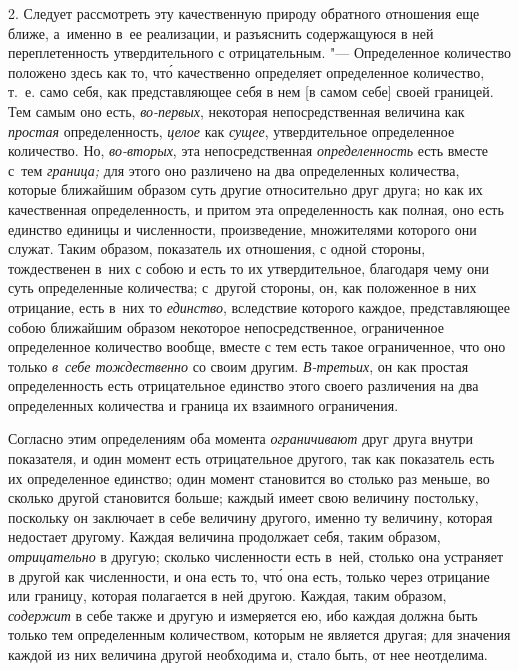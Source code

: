 2. Следует рассмотреть эту качественную природу обратного отношения еще ближе,
а~именно в~ее реализации, и разъяснить содержащуюся в ней переплетенность
утвердительного с отрицательным. "--- Определенное количество положено здесь
как то, чт\'{о} качественно определяет определенное количество, т.~е. само
себя, как представляющее себя в нем [в самом себе] своей границей. Тем самым
оно есть, {\em во-первых}, некоторая непосредственная величина как
{\em простая} определенность, {\em целое} как {\em сущее}, утвердительное
определенное количество. Но, {\em во-вторых}, эта непосредственная
{\em определенность} есть вместе с~тем {\em граница;} для этого оно различено
на два определенных количества, которые ближайшим образом суть другие
относительно друг друга; но как их качественная определенность, и притом эта
определенность как полная, оно есть единство единицы и численности,
произведение, множителями которого они служат. Таким образом, показатель их
отношения, с одной стороны, тождественен в~них с собою и есть то их
утвердительное, благодаря чему они суть определенные количества; с~другой
стороны, он, как положенное в них отрицание, есть в~них то {\em единство},
вследствие которого каждое, представляющее собою ближайшим образом некоторое
непосредственное, ограниченное определенное количество вообще, вместе с тем
есть такое ограниченное, что оно только {\em в~себе тождественно} со своим
другим. {\em В-третьих}, он как простая определенность есть отрицательное
единство этого своего различения на два определенных количества и граница их
взаимного ограничения.

Согласно этим определениям оба момента {\em ограничивают} друг друга внутри
показателя, и один момент есть отрицательное другого, так как показатель есть
их определенное единство; один момент становится во столько раз меньше, во
сколько другой становится больше; каждый имеет свою величину постольку,
поскольку он заключает в себе величину другого, именно ту величину, которая
недостает другому. Каждая величина продолжает себя, таким образом,
{\em отрицательно} в другую; сколько численности есть в~ней, столько она
устраняет в другой как численности, и она есть то, чт\'{о} она есть, только
через отрицание или границу, которая полагается в ней другою. Каждая, таким
образом, {\em содержит} в себе также и другую и измеряется ею, ибо каждая
должна быть только тем определенным количеством, которым не является другая;
для значения каждой из них величина другой необходима и, стало быть, от нее
неотделима.

